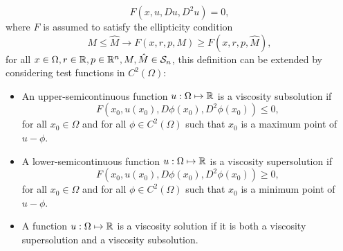 \begin{equation}
    F(x, u, D u, D^2 u) = 0,
\end{equation}
where $F$ is assumed to satisfy the ellipticity condition
\begin{equation}
    M \leq \hat M \rightarrow F(x,r,p,M) \geq F(x,r,p,\hat M),
\end{equation}
for all $x \in \Omega, r \in \mathbb{R}, p \in \mathbb{R}^n, M,\hat M \in \mathcal{S}_n$,
this definition can be extended by considering test functions in $C^2(\Omega)$:
\begin{definition}
    \begin{itemize}
        \item An upper-semicontinuous function $u : \Omega \mapsto \mathbb{R}$ is a viscosity subsolution if
    \begin{equation*}
        F(x_0, u(x_0), D \phi(x_0), D^2 \phi(x_0)) \leq 0,
    \end{equation*}
    for all $x_0 \in \Omega$ and for all $\phi \in C^2(\Omega)$ such that $x_0$ is a maximum point of $u - \phi$.
        \item A lower-semicontinuous function $u : \Omega \mapsto \mathbb{R}$ is a viscosity supersolution if
    \begin{equation*}
        F(x_0, u(x_0), D\phi(x_0), D^2 \phi(x_0)) \geq 0,
    \end{equation*}
    for all $x_0 \in \Omega$ and for all $\phi \in C^2(\Omega)$ such that $x_0$ is a minimum point of $u - \phi$.
        \item A function $u : \Omega \mapsto \mathbb{R}$ is a viscosity solution if it is both
        a viscosity supersolution and a viscosity subsolution.
    \end{itemize}
\end{definition}